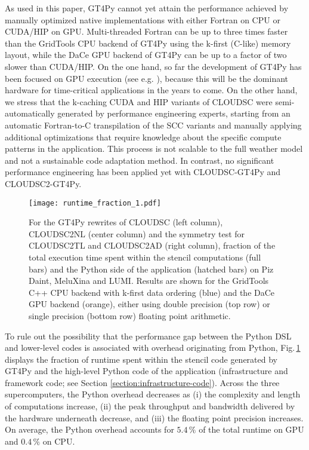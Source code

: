 \documentclass[main.tex]{subfiles}
\begin{document}
        As used in this paper, GT4Py cannot yet attain the performance achieved by manually optimized native implementations with either Fortran on CPU or CUDA/HIP on GPU. Multi-threaded Fortran can be up to three times faster than the GridTools CPU backend of GT4Py using the k-first (C-like) memory layout, while the DaCe GPU backend of GT4Py can be up to a factor of two slower than CUDA/HIP. On the one hand, so far the development of GT4Py has been focused on GPU execution (see e.g. \cite{dahm23}), because this will be the dominant hardware for time-critical applications in the years to come. On the other hand, we stress that the k-caching CUDA and HIP variants of CLOUDSC were semi-automatically generated by performance engineering experts, starting from an automatic Fortran-to-C transpilation of the SCC variants and manually applying additional optimizations that require knowledge about the specific compute patterns in the application. This process is not scalable to the full weather model and not a sustainable code adaptation method. In contrast, no significant performance engineering  has been applied yet with CLOUDSC-GT4Py and CLOUDSC2-GT4Py.

        \begin{figure}[t!]
            \centering
            \texttt{[image: runtime\_fraction\_1.pdf]}
            \caption{For the GT4Py rewrites of CLOUDSC (left column), CLOUDSC2NL (center column) and the symmetry test for CLOUDSC2TL and CLOUDSC2AD (right column), fraction of the total execution time spent within the stencil computations (full bars) and the Python side of the application (hatched bars) on Piz Daint, MeluXina and LUMI. Results are shown for the GridTools C++ CPU backend with k-first data ordering (blue) and the DaCe GPU backend (orange), either using double precision (top row) or single precision (bottom row) floating point arithmetic.}
            \label{fig:runtime-fraction}
        \end{figure}

        To rule out the possibility that the performance gap between the Python DSL and lower-level codes is associated with overhead originating from Python, Fig.\,\ref{fig:runtime-fraction} displays the fraction of runtime spent within the stencil code generated by GT4Py and the high-level Python code of the application (infrastructure and framework code; see Section \ref{section:infrastructure-code}). Across the three supercomputers, the Python overhead decreases as (i) the complexity and length of computations increase, (ii) the peak throughput and bandwidth delivered by the hardware underneath decrease, and (iii) the floating point precision increases. On average, the Python overhead accounts for $5.4\,\%$ of the total runtime on GPU and $0.4\,\%$ on CPU. 
\end{document}
